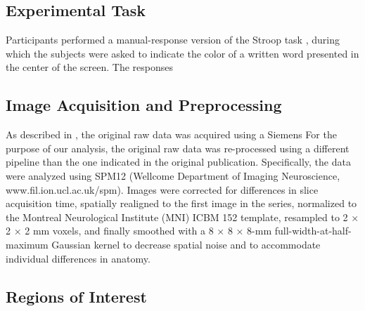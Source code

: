\documentclass[10pt,letterpaper]{article}
\begin{document}
\subsection{Experimental Task}

Participants performed a manual-response version of the Stroop task \cite{Stroop1935}, during which the subjects were asked to indicate the color of a written word presented in the center of the screen. The responses 

\subsection{Image Acquisition and Preprocessing}

As described in , the original raw data was acquired using a Siemens 
For the purpose of our analysis, the original raw data was re-processed using a different pipeline than the one indicated in the original publication. Specifically, the data were analyzed using SPM12 (Wellcome Department of Imaging Neuroscience, www.fil.ion.ucl.ac.uk/spm). Images were corrected for differences in slice acquisition time, spatially realigned to the first image in the series, normalized to the Montreal Neurological Institute (MNI) ICBM 152 template, resampled to 2 × 2 × 2 mm voxels, and finally smoothed with a 8 × 8 × 8-mm full-width-at-half-maximum Gaussian kernel to decrease spatial noise and to accommodate individual differences in anatomy. %

\subsection{Regions of Interest}
\end{document}
